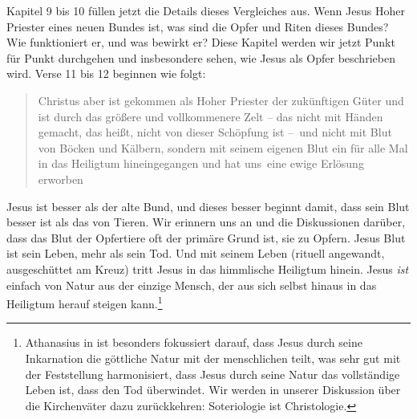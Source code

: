 Kapitel 9 bis 10 füllen jetzt die Details dieses Vergleiches aus. Wenn Jesus Hoher Priester eines neuen Bundes ist, was sind die Opfer und Riten dieses Bundes? Wie funktioniert er, und was bewirkt er?
Diese Kapitel werden wir jetzt Punkt für Punkt durchgehen und insbesondere sehen, wie Jesus als Opfer beschrieben wird.
Verse 11 bis 12 beginnen wie folgt:
\begin{quote}
Christus aber ist gekommen als Hoher Priester der zukünftigen Güter und ist durch das größere und vollkommenere Zelt –
das nicht mit Händen gemacht, das heißt, nicht von dieser Schöpfung ist – und nicht mit Blut von Böcken und Kälbern,
sondern mit seinem eigenen Blut ein für alle Mal in das Heiligtum hineingegangen und hat \textlangle uns\textrangle\ eine ewige Erlösung erworben
\end{quote}
Jesus ist besser als der alte Bund, und dieses besser beginnt damit, dass sein Blut besser ist als das von Tieren.
Wir erinnern uns an  und die Diskussionen darüber, dass das Blut der Opfertiere oft der primäre Grund ist, sie zu Opfern.
Jesus Blut ist sein Leben, mehr als sein Tod.
Und mit seinem Leben (rituell angewandt, ausgeschüttet am Kreuz) tritt Jesus in das himmlische Heiligtum hinein.
Jesus \textit{ist} einfach von Natur aus der einzige Mensch, der aus sich selbst hinaus in das Heiligtum herauf steigen kann.\footnote{
Athanasius in \Cite{de-incarnatione-verbi} ist besonders fokussiert darauf, dass Jesus durch seine Inkarnation die göttliche Natur mit der menschlichen teilt,
was sehr gut mit der Feststellung harmonisiert, dass Jesus durch seine Natur das vollständige Leben ist, dass den Tod überwindet.
Wir werden in unserer Diskussion über die Kirchenväter dazu zurückkehren: Soteriologie ist Christologie.}

